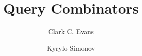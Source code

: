 \documentclass[9pt,twocolumn]{amsart}
\begin{document}
\title{Query Combinators}

\author{Clark C. Evans}
\author{Kyrylo Simonov}



\maketitle










\end{document}
